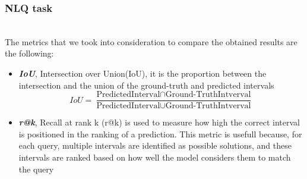 \documentclass[conference]{IEEEtran}
\begin{document}
\subsubsection{NLQ task}
\hspace{1cm} \\
The metrics that we took into consideration to compare the obtained results are the following:
\begin{itemize}
    \item \textit{\textbf{IoU}}, Intersection over Union(IoU), it is the proportion between the intersection and the union of the ground-truth and predicted intervals\\
    \begin{equation}
        IoU = \frac{\text{PredictedInterval} \cap \text{Ground-TruthIntverval}}{\text{PredictedInterval} \cup \text{Ground-TruthIntverval}}
    \end{equation}
    \item \textit{\textbf{r@k}}, Recall at rank k (r@k) is used to measure how high the correct interval is positioned in the ranking of a prediction. %
    This metric is usefull because, for each query, multiple intervals are identified as possible solutions, and these intervals are ranked based on how well the model considers them to match the query
\end{itemize}
\end{document}
